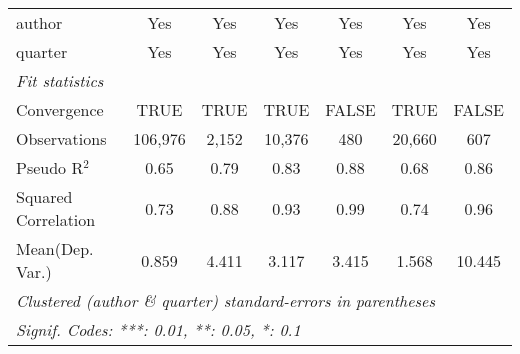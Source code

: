 \begin{tabular}{lcccccc}
   author                                                     & Yes            & Yes            & Yes           & Yes           & Yes           & Yes\\  
   quarter                                                    & Yes            & Yes            & Yes           & Yes           & Yes           & Yes\\  
   \midrule
   \emph{Fit statistics}\\
   Convergence                                                &TRUE            & TRUE           & TRUE          & FALSE         & TRUE          & FALSE\\  
   Observations                                               & 106,976        & 2,152          & 10,376        & 480           & 20,660        & 607\\  
   Pseudo R$^2$                                               & 0.65           & 0.79           & 0.83          & 0.88          & 0.68          & 0.86\\  
   Squared Correlation                                        & 0.73           & 0.88           & 0.93          & 0.99          & 0.74          & 0.96\\  
Mean(Dep. Var.) & 0.859 & 4.411 & 3.117 & 3.415 & 1.568 & 10.445 \\
   \midrule \midrule
   \multicolumn{7}{l}{\emph{Clustered (author \& quarter) standard-errors in parentheses}}\\
   \multicolumn{7}{l}{\emph{Signif. Codes: ***: 0.01, **: 0.05, *: 0.1}}\\
\end{tabular}
\par\endgroup
